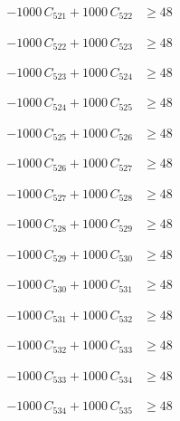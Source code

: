 \documentclass[a4paper,11pt]{article}
\begin{document}
\begin{align}
-1000\,C_{521} + 1000\,C_{522} &\geq 48 \nonumber
\end{align}

\begin{align}
-1000\,C_{522} + 1000\,C_{523} &\geq 48 \nonumber
\end{align}

\begin{align}
-1000\,C_{523} + 1000\,C_{524} &\geq 48 \nonumber
\end{align}

\begin{align}
-1000\,C_{524} + 1000\,C_{525} &\geq 48 \nonumber
\end{align}

\begin{align}
-1000\,C_{525} + 1000\,C_{526} &\geq 48 \nonumber
\end{align}

\begin{align}
-1000\,C_{526} + 1000\,C_{527} &\geq 48 \nonumber
\end{align}

\begin{align}
-1000\,C_{527} + 1000\,C_{528} &\geq 48 \nonumber
\end{align}

\begin{align}
-1000\,C_{528} + 1000\,C_{529} &\geq 48 \nonumber
\end{align}

\begin{align}
-1000\,C_{529} + 1000\,C_{530} &\geq 48 \nonumber
\end{align}

\begin{align}
-1000\,C_{530} + 1000\,C_{531} &\geq 48 \nonumber
\end{align}

\begin{align}
-1000\,C_{531} + 1000\,C_{532} &\geq 48 \nonumber
\end{align}

\begin{align}
-1000\,C_{532} + 1000\,C_{533} &\geq 48 \nonumber
\end{align}

\begin{align}
-1000\,C_{533} + 1000\,C_{534} &\geq 48 \nonumber
\end{align}

\begin{align}
-1000\,C_{534} + 1000\,C_{535} &\geq 48 \nonumber
\end{align}
\end{document}
